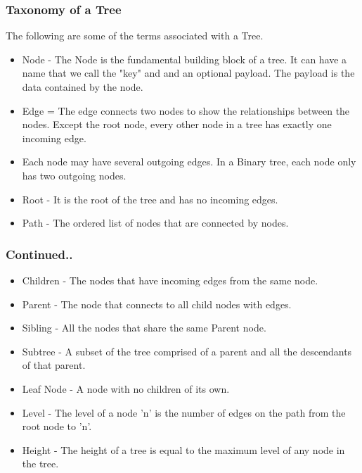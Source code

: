 \documentclass{beamer}
\begin{document}
\begin{frame}
\frametitle{Taxonomy of a Tree}
The following are some of the terms associated with a Tree.

\begin{itemize}
\item Node - The Node is the fundamental building block of a tree. It can have a name that we call the "key" and and an optional payload. The payload is the data contained by the node.

\item Edge = The edge connects two nodes to show the relationships between the nodes. Except the root node, every other node in a tree has exactly one incoming edge. 

\item Each node may have several outgoing edges. In a Binary tree, each node only has two outgoing nodes.
\item Root - It is the root of the tree and has no incoming edges.
\item Path - The ordered list of nodes that are connected by nodes.


\end{itemize}
\end{frame}

\begin{frame}
\frametitle{Continued..}

\begin{itemize}
\item Children - The nodes that have incoming edges from the same node.
\item Parent - The node that connects to all child nodes with edges.
\item Sibling -  All the nodes that share the same Parent node.
\item Subtree - A subset of the tree comprised of a parent and all the descendants of that parent.
\item Leaf Node - A node with no children of its own.
\item Level - The level of a node 'n' is the number of edges on the path from the root node to 'n'.
\item Height - The height of a tree is equal to the maximum level of any node in the tree.
\end{itemize}
\end{frame}
\end{document}
